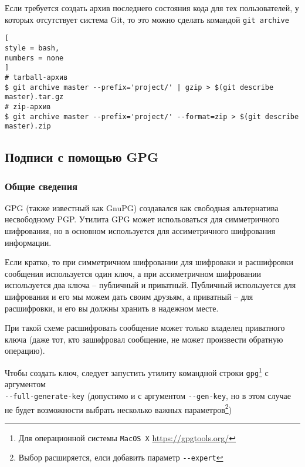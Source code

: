 \documentclass[%
	11pt,
	a4paper,
	utf8,
		]{article}
\begin{document}
Если требуется создать архив последнего состояния кода для тех пользователей, у которых отсутствует система Git, то это можно сделать командой \texttt{git archive}
\begin{lstlisting}[
style = bash,
numbers = none
]
# tarball-архив
$ git archive master --prefix='project/' | gzip > $(git describe master).tar.gz
# zip-архив
$ git archive master --prefix='project/' --format=zip > $(git describe master).zip
\end{lstlisting}



\subsection{Подписи с помощью GPG}

\subsubsection{Общие сведения}

GPG (также известный как GnuPG) создавался как свободная альтернатива несвободному PGP. Утилита GPG может испольоваться для симметричного шифрования, но в основном используется для ассиметричного шифрования информации.

Если кратко, то при симметричном шифровании для шифроваки и расшифровки сообщения используется один ключ, а при ассиметричном шифровании используется два ключа -- публичный и приватный. Публичный используется для шифрования и его мы можем дать своим друзьям, а приватный -- для расшифровки, и его вы должны хранить в надежном месте.

При такой схеме расшифровать сообщение может только владелец приватного ключа (даже тот, кто зашифровал сообщение, не может произвести обратную операцию).


Чтобы создать ключ, следует запустить утилиту командной строки \texttt{gpg}\footnote{Для операционной системы \texttt{MacOS X} \url{https://gpgtools.org/}} с аргументом \\\mbox{\lstinline{--full-generate-key}} (допустимо и с аргументом \lstinline{--gen-key}, но в этом случае не будет возможности выбрать несколько важных параметров\footnote{Выбор расширяется, елси добавить параметр \lstinline{--expert}})
\end{document}
